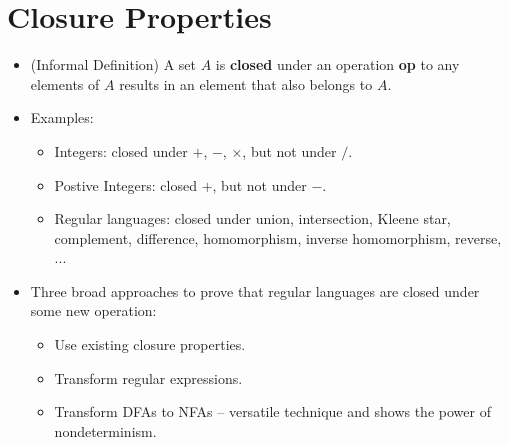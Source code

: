
\section{Closure Properties}
\begin{itemize}
    \item (Informal Definition) A set $A$ is \textbf{closed} under an operation \textbf{op} to any elements of $A$ results in an element that also belongs to $A$.
    \item Examples:
    \begin{itemize}
        \item Integers: closed under $+$, $-$, $\times$, but not under $/$.
        \item Postive Integers: closed $+$, but not under $-$.
        \item Regular languages: closed under union, intersection, Kleene star, complement, difference, homomorphism, inverse homomorphism, reverse, ...
    \end{itemize}
    \item Three broad approaches to prove that regular languages are closed under some new operation:
    \begin{itemize}
        \item Use existing closure properties.
        \item Transform regular expressions.
        \item Transform DFAs to NFAs -- versatile technique and shows the power of nondeterminism.
    \end{itemize}
\end{itemize}

